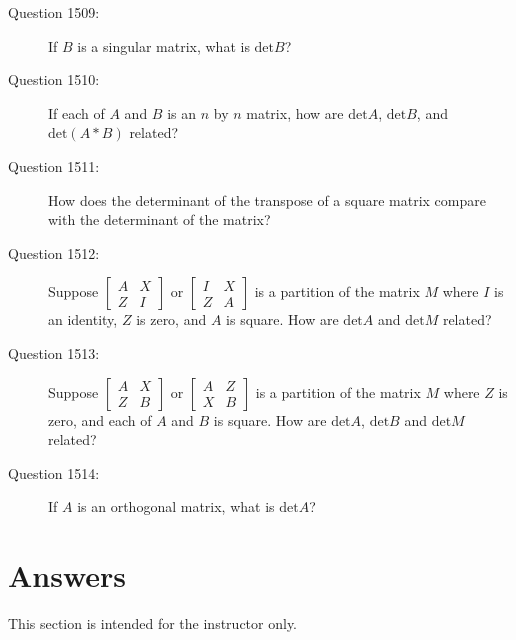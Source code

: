 \documentclass{article}
\begin{document}
\begin{description}
  \item[Question 1509:] If $B$ is a singular matrix, what is $\text{det} B$?

  \item[Question 1510:] If each of $A$ and $B$ is an $n$ by $n$ matrix, how are $\text{det} A$, $\text{det} B$, and $\text{det} (A*B)$ related?

  \item[Question 1511:] How does the determinant of the transpose of a square matrix compare with the determinant of the matrix?

  \item[Question 1512:] Suppose $ 
    \begin{bmatrix}
      A & X \\
      Z & I
    \end{bmatrix}
    $ or $ 
    \begin{bmatrix}
      I & X \\
      Z & A
    \end{bmatrix}
    $ is a partition of the matrix $M$ where $I$ is an identity, $Z$ is zero, and $A$ is square. How are $\text{det} A$ and $\text{det} M$ related?

  \item[Question 1513:] Suppose $
    \begin{bmatrix}
      A & X \\
      Z & B
    \end{bmatrix}
    $ or $ 
    \begin{bmatrix}
      A & Z \\
      X & B
    \end{bmatrix}
    $ is a partition of the matrix $M$ where $Z$ is zero, and each of $A$ and $B$ is square. How are $\text{det} A$, $\text{det} B$ and $\text{det} M$ related?

  \item[Question 1514:] If $A$ is an orthogonal matrix, what is $\text{det} A$?

\end{description}


\newpage

\section*{Answers}

This section is intended for the instructor only. 
\vspace{0.5cm}
\end{document}
